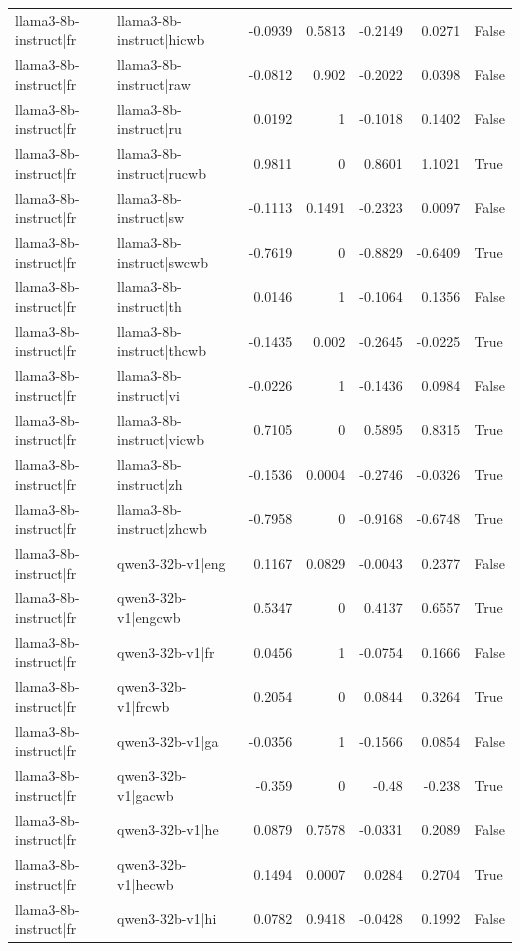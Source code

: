 \begin{table}
\begin{tabular}{l l r r r r l}
llama3-8b-instruct|fr & llama3-8b-instruct|hicwb & -0.0939 & 0.5813 & -0.2149 & 0.0271 & False \\
llama3-8b-instruct|fr & llama3-8b-instruct|raw & -0.0812 & 0.902 & -0.2022 & 0.0398 & False \\
llama3-8b-instruct|fr & llama3-8b-instruct|ru & 0.0192 & 1 & -0.1018 & 0.1402 & False \\
llama3-8b-instruct|fr & llama3-8b-instruct|rucwb & 0.9811 & 0 & 0.8601 & 1.1021 & True \\
llama3-8b-instruct|fr & llama3-8b-instruct|sw & -0.1113 & 0.1491 & -0.2323 & 0.0097 & False \\
llama3-8b-instruct|fr & llama3-8b-instruct|swcwb & -0.7619 & 0 & -0.8829 & -0.6409 & True \\
llama3-8b-instruct|fr & llama3-8b-instruct|th & 0.0146 & 1 & -0.1064 & 0.1356 & False \\
llama3-8b-instruct|fr & llama3-8b-instruct|thcwb & -0.1435 & 0.002 & -0.2645 & -0.0225 & True \\
llama3-8b-instruct|fr & llama3-8b-instruct|vi & -0.0226 & 1 & -0.1436 & 0.0984 & False \\
llama3-8b-instruct|fr & llama3-8b-instruct|vicwb & 0.7105 & 0 & 0.5895 & 0.8315 & True \\
llama3-8b-instruct|fr & llama3-8b-instruct|zh & -0.1536 & 0.0004 & -0.2746 & -0.0326 & True \\
llama3-8b-instruct|fr & llama3-8b-instruct|zhcwb & -0.7958 & 0 & -0.9168 & -0.6748 & True \\
llama3-8b-instruct|fr & qwen3-32b-v1|eng & 0.1167 & 0.0829 & -0.0043 & 0.2377 & False \\
llama3-8b-instruct|fr & qwen3-32b-v1|engcwb & 0.5347 & 0 & 0.4137 & 0.6557 & True \\
llama3-8b-instruct|fr & qwen3-32b-v1|fr & 0.0456 & 1 & -0.0754 & 0.1666 & False \\
llama3-8b-instruct|fr & qwen3-32b-v1|frcwb & 0.2054 & 0 & 0.0844 & 0.3264 & True \\
llama3-8b-instruct|fr & qwen3-32b-v1|ga & -0.0356 & 1 & -0.1566 & 0.0854 & False \\
llama3-8b-instruct|fr & qwen3-32b-v1|gacwb & -0.359 & 0 & -0.48 & -0.238 & True \\
llama3-8b-instruct|fr & qwen3-32b-v1|he & 0.0879 & 0.7578 & -0.0331 & 0.2089 & False \\
llama3-8b-instruct|fr & qwen3-32b-v1|hecwb & 0.1494 & 0.0007 & 0.0284 & 0.2704 & True \\
llama3-8b-instruct|fr & qwen3-32b-v1|hi & 0.0782 & 0.9418 & -0.0428 & 0.1992 & False \\

\end{tabular}
\end{table}
